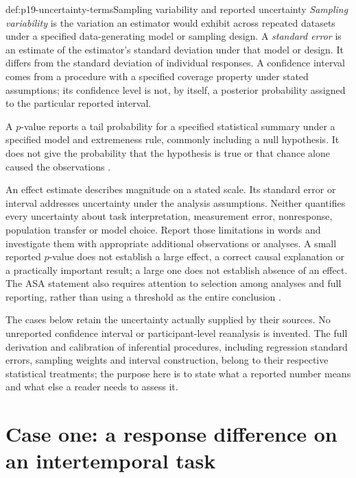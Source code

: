 \begin{hbdefinition}{def:p19-uncertainty-terms}{Sampling variability and reported uncertainty}
\emph{Sampling variability} is the variation an estimator would exhibit across
repeated datasets under a specified data-generating model or sampling design.
A \emph{standard error} is an estimate of the estimator's standard deviation
under that model or design. It differs from the standard deviation of individual
responses. A confidence interval comes from a procedure with a specified
coverage property under stated assumptions; its confidence level is not, by
itself, a posterior probability assigned to the particular reported interval.

A \(p\)-value reports a tail probability for a specified statistical summary
under a specified model and extremeness rule, commonly including a null
hypothesis. It does not give the probability that the hypothesis is true or
that chance alone caused the observations
\cite[p.~131]{WassersteinLazar2016ASA}.
\end{hbdefinition}

An effect estimate describes magnitude on a stated scale. Its standard error
or interval addresses uncertainty under the analysis assumptions. Neither
quantifies every uncertainty about task interpretation, measurement error,
nonresponse, population transfer or model choice. Report those limitations in
words and investigate them with appropriate additional observations or
analyses. A small reported \(p\)-value does not establish a large effect, a
correct causal explanation or a practically important result; a large one
does not establish absence of an effect. The ASA statement also requires
attention to selection among analyses and full reporting, rather than using
a threshold as the entire conclusion
\cite[principles~3--6, pp.~131--132]{WassersteinLazar2016ASA}.

The cases below retain the uncertainty actually supplied by their sources.
No unreported confidence interval or participant-level reanalysis is invented.
The full derivation and calibration of inferential procedures, including
regression standard errors, sampling weights and interval construction, belong
to their respective statistical treatments; the purpose here is to state what
a reported number means and what else a reader needs to assess it.

\section{Case one: a response difference on an intertemporal task}
\label{sec:p19-frederick-case}

